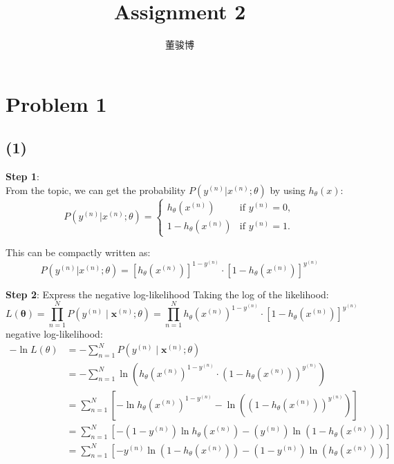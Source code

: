 \documentclass[onecolumn,oneside]{SUSTechHomework}
\author{董骏博}
\title{Assignment 2}
\begin{document}
    \maketitle

    \section{Problem 1}
    \subsection*{(1)}
    \textbf{Step 1}: \\
    From the topic, we can get the probability \( P(y^{(n)} | x^{(n)}; \theta) \) by using \( h_\theta(x) \):
    \[
        P(y^{(n)} | x^{(n)}; \theta) =
        \begin{cases}
            h_\theta(x^{(n)})     & \text{if } y^{(n)} = 0, \\
            1 - h_\theta(x^{(n)}) & \text{if } y^{(n)} = 1.
        \end{cases}
    \]

    This can be compactly written as:
    \[
        P(y^{(n)} | x^{(n)}; \theta) = [h_\theta(x^{(n)})]^{1 - y^{(n)}} \cdot [1 - h_\theta(x^{(n)})]^{y^{(n)}}
    \]

    \textbf{Step 2}: Express the negative log-likelihood
    Taking the log of the likelihood:
    \[
    L(\mathbf{\theta}) = \prod_{n=1}^N P\left(y^{(n)} \mid \mathbf{x}^{(n)}; \theta \right) = \prod_{n=1}^N h_\theta(x^{(n)})^{1 - y^{(n)}} \cdot [1 - h_\theta(x^{(n)})]^{y^{(n)}}
    \]
    negative log-likelihood:
    \[
    \begin{split}
        -\ln L(\theta) &= - \sum_{n=1}^N P\left( y^{(n)} \mid \mathbf{x}^{(n)}; \theta\right)\\
        &= -\sum_{n=1}^N \ln \left(h_\theta(x^{(n)})^{1 - y^{(n)}} \cdot (1 - h_\theta(x^{(n)}))^{y^{(n)}}\right)\\
        &= \sum_{n=1}^N \left[-\ln h_\theta(x^{(n)})^{1 - y^{(n)}}  - \ln\left((1 - h_\theta(x^{(n)}))^{y^{(n)}}\right)\right] \\
        &= \sum_{n=1}^N \left[- (1 - y^{(n)}) \ln h_\theta(x^{(n)})  - (y^{(n)})\ln (1 - h_\theta(x^{(n)}))\right] \\
        &= \sum_{n=1}^N \left[ -y^{(n)} \ln \left(1 - h_\theta\left(x^{(n)}\right)\right) - \left(1 - y^{(n)}\right) \ln \left(h_\theta\left(x^{(n)}\right)\right) \right]
    \end{split}
    \]
\end{document}
